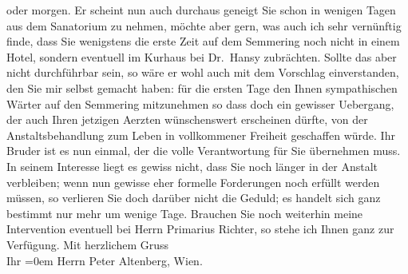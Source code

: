 \begin{ledgroupsized}[t]{13cm}
               oder morgen. Er scheint nun auch durchaus geneigt Sie schon in wenigen Tagen aus dem
                  Sanatorium zu nehmen, möchte
               aber gern, was auch ich sehr vernünftig finde, dass Sie wenigstens die erste Zeit auf
               dem Semmering noch nicht in einem Hotel, sondern
               eventuell im Kurhaus bei Dr. Hansy zubrächten. Sollte das aber nicht durchführbar sein, so
               wäre er wohl auch mit dem Vorschlag einverstanden, den Sie mir selbst gemacht haben:
               für die ersten Tage den Ihnen sympathischen Wärter auf den Semmering mitzunehmen {\pb}so dass doch ein gewisser
               Uebergang, der auch Ihren jetzigen Aerzten wünschenswert erscheinen dürfte, von der
               Anstaltsbehandlung zum Leben in vollkommener Freiheit geschaffen würde. Ihr Bruder ist es nun einmal, der
               die volle Verantwortung für Sie übernehmen muss. In seinem Interesse liegt es gewiss
               nicht, dass Sie noch länger in der Anstalt verbleiben; wenn nun gewisse eher formelle
               Forderungen noch erfüllt werden müssen, so verlieren Sie doch darüber nicht die
               Geduld; es handelt sich ganz bestimmt nur mehr um wenige Tage. Brauchen Sie noch
               weiterhin meine Intervention eventuell bei Herrn Primarius Richter, so stehe ich Ihnen ganz zur Verfügung.\pend
           \pstart
           Mit herzlichem Gruss{\\[\baselineskip]}Ihr \pend
           \leftskip=0em{}\pstart
           \noindent{}Herrn Peter Altenberg, Wien.\pend
           
         
         \endnumbering{}\end{ledgroupsized}  \newcommand{\dateiname}{L02128}\newcommand{\titel}{Arthur Schnitzler an Peter Altenberg, 22. 4. 1913}\newcommand{\editorInnen}{Martin Anton Müller und Gerd-Hermann Susen}
      